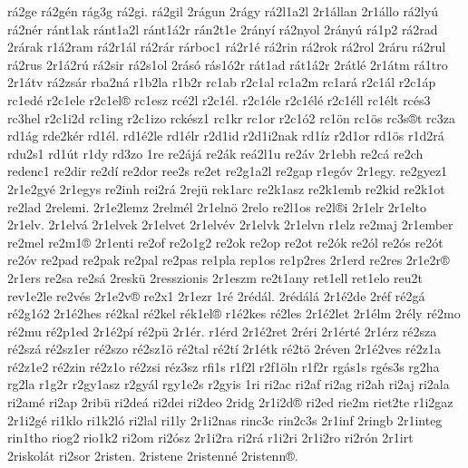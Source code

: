 {r^^e12ge
r^^e12g^^e9n
r^^e1g3g
r^^e12gi.
r^^e12gil
2r^^e1gun
2r^^e1gy
r^^e12l1a2l
2r1^^e1llan
2r1^^e1llo
r^^e12ly^^fa
r^^e12n^^e9r
r^^e1nt1ak
r^^e1nt1a2l
r^^e1nt1^^e12r
r^^e1n2t1e
2r^^e1ny^^ed
r^^e12nyol
2r^^e1ny^^fa
r^^e11p2
r^^e12rad
2r^^e1rak
r1^^e12ram
r^^e12r1^^e1l
r^^e12r^^e1r
r^^e1rboc1
r^^e12r1^^e9
r^^e12rin
r^^e12rok
r^^e12rol
2r^^e1ru
r^^e12rul
r^^e12rus
2r1^^e12r^^fa
r^^e12sir
r^^e12s1ol
2r^^e1s^^f3
r^^e1s1^^f32r
r^^e1t1ad
r^^e1t1^^e12r
2r^^e1tl^^e9
2r1^^e1tm
r^^e11tro
2r1^^e1tv
r^^e12zs^^e1r
rba2n^^e1
r1b2la
r1b2r
rc1ab
r2c1al
rc1a2m
rc1ar^^e1
r2c1^^e1l
r2c1^^e1p
rc1ed^^e9
r2c1ele
r2c1el^^ae
rc1esz
rc^^e92l
r2c1^^e9l.
r2c1^^e9le
r2c1^^e9l^^e9
r2c1^^e9ll
rc1^^e9lt
rc^^e9s3
rc3hel
r2c1i2d
rc1ing
r2c1izo
rck^^e9sz1
rc1kr
rc1or
r2c1^^f32
rc1^^f6n
rc1^^f6s
rc3s^^aet
rc3za
rd1^^e1g
rde2k^^e9r
rd1^^e9l.
rd1^^e92le
rd1^^e9lr
r2d1id
r2d1i2nak
rd1^^edz
r2d1or
rd1^^f6s
r1d2r^^e1
rdu2s1
rd1^^fat
r1dy
rd3zo
1re
re2^^e1j^^e1
re2^^e1k
re^^e12l1u
re2^^e1v
2r1ebh
re2c^^e1
re2ch
redenc1
re2dir
re2d^^ed
re2dor
ree2s
re2et
re2g1a2l
re2gap
r1eg^^f3v
2r1egy.
re2gyez1
2r1e2gy^^e9
2r1egys
re2inh
rei2r^^e1
2rej^^fc
rek1arc
re2k1asz
re2k1emb
re2kid
re2k1ot
re2lad
2relemi.
2r1e2lemz
2relm^^e9l
2r1eln^^f6
2relo
re2l1os
re2l^^aei
2r1elr
2r1elto
2r1elv.
2r1elv^^e1
2r1elvek
2r1elvet
2r1elv^^e9v
2r1elvk
2r1elvn
r1elz
re2maj
2r1ember
re2mel
re2m1^^ae
2r1enti
re2of
re2o1g2
re2ok
re2op
re2ot
re2^^f3k
re2^^f3l
re2^^f3s
re2^^f3t
re2^^f3v
re2pad
re2pak
re2pal
re2pas
re1pla
rep1os
re1p2res
2r1erd
re2res
2r1e2r^^ae
2r1ers
re2sa
re2s^^e1
2resk^^fc
2resszionis
2r1eszm
re2t1any
ret1ell
ret1elo
reu2t
rev1e2le
re2v^^e9s
2r1e2v^^ae
re2x1
2r1ezr
1r^^e9
2r^^e9d^^e1l.
2r^^e9d^^e1l^^e1
2r1^^e92de
2r^^e9f
r^^e92g^^e1
r^^e92g1^^f32
2r1^^e92hes
r^^e92kal
r^^e92kel
r^^e9k1el^^ae
r1^^e92kes
r^^e92les
2r1^^e92let
2r1^^e9lm
2r^^e9ly
r^^e92mo
r^^e92mu
r^^e92p1ed
2r1^^e92p^^ed
r^^e92p^^fc
2r1^^e9r.
r1^^e9rd
2r1^^e92ret
2r^^e9ri
2r1^^e9rt^^e9
2r1^^e9rz
r^^e92sza
r^^e92sz^^e1
r^^e92sz1er
r^^e92szo
r^^e92sz1^^f6
r^^e92tal
r^^e92t^^ed
2r1^^e9tk
r^^e92t^^f6
2r^^e9ven
2r1^^e92ves
r^^e92z1a
r^^e92z1e2
r^^e92zin
r^^e92z1o
r^^e92zsi
r^^e9z3sz
rfi1s
r1f2l
r2f1^^f6ln
r1f2r
rg^^e1s1s
rg^^e9s3s
rg2ha
rg2la
r1g2r
r2gy1asz
r2gy^^e1l
rgy1e2s
r2gyis
1ri
ri2ac
ri2af
ri2ag
ri2ah
ri2aj
ri2ala
ri2am^^e9
ri2ap
2rib^^fc
ri2de^^e1
ri2dei
ri2deo
2ridg
2r1i2d^^ae
ri2ed
rie2m
riet2te
r1i2gaz
2r1i2g^^e9
ri1klo
ri1k2l^^f3
ri2lal
ri1ly
2r1i2nas
rinc3c
rin2c3s
2r1inf
2ringb
2r1integ
rin1tho
riog2
rio1k2
ri2om
ri2^^f3sz
2r1i2ra
ri2r^^e1
r1i2ri
2r1i2ro
ri2r^^f3n
2r1irt
2riskol^^e1t
ri2sor
2risten.
2ristene
2ristenn^^e9
2ristenn^^ae.
}
